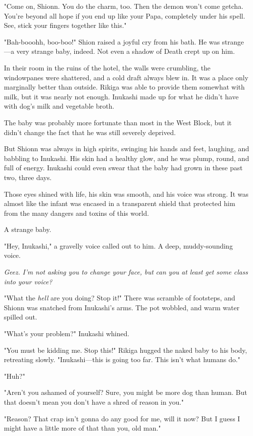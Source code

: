 "Come on, Shionn. You do the charm, too. Then the demon won't come
getcha. You're beyond all hope if you end up like your Papa, completely
under his spell. See, stick your fingers together like this."

"Bah-booohh, boo-boo!" Shion raised a joyful cry from his bath. He was
strange---a very strange baby, indeed. Not even a shadow of Death crept up
on him.

In their room in the ruins of the hotel, the walls were crumbling, the
windowpanes were shattered, and a cold draft always blew in. It was a
place only marginally better than outside. Rikiga was able to provide
them somewhat with milk, but it was nearly not enough. Inukashi made up
for what he didn't have with dog's milk and vegetable broth.

The baby was probably more fortunate than most in the West Block, but it
didn't change the fact that he was still severely deprived.

But Shionn was always in high spirits, swinging his hands and feet,
laughing, and babbling to Inukashi. His skin had a healthy glow, and he
was plump, round, and full of energy. Inukashi could even swear that the
baby had grown in these past two, three days.

Those eyes shined with life, his skin was smooth, and his voice was
strong. It was almost like the infant was encased in a transparent
shield that protected him from the many dangers and toxins of this
world.

A strange baby.

"Hey, Inukashi," a gravelly voice called out to him. A deep,
muddy-sounding voice.

\emph{Geez. I'm not asking you to change your face, but can you at least get
some class into your voice?}

"What the \emph{hell} are you doing? Stop it!" There was scramble of footsteps,
and Shionn was snatched from Inukashi's arms. The pot wobbled, and warm
water spilled out.

"What's your problem?" Inukashi whined.

"You must be kidding me. Stop this!" Rikiga hugged the naked baby to his
body, retreating slowly. "Inukashi---this is going too far. This isn't
what humans do."

"Huh?"

"Aren't you ashamed of yourself? Sure, you might be more dog than human.
But that doesn't mean you don't have a shred of reason in you."

"Reason? That crap isn't gonna do any good for me, will it now? But I
guess I might have a little more of that than you, old man."

